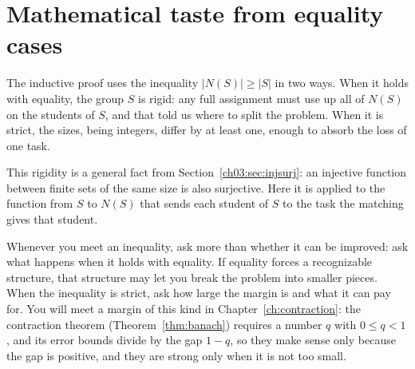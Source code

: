 \section{Mathematical taste from equality cases}\label{ch09:sec:taste}
The inductive proof uses the inequality $|N(S)|\ge|S|$ in two ways. When it holds with equality, the group $S$ is rigid: any full assignment must use up all of $N(S)$ on the students of $S$, and that told us where to split the problem. When it is strict, the sizes, being integers, differ by at least one, enough to absorb the loss of one task.

This rigidity is a general fact from Section~\ref{ch03:sec:injsurj}: an injective function between finite sets of the same size is also surjective. Here it is applied to the function from $S$ to $N(S)$ that sends each student of $S$ to the task the matching gives that student.

Whenever you meet an inequality, ask more than whether it can be improved: ask what happens when it holds with equality. If equality forces a recognizable structure, that structure may let you break the problem into smaller pieces. When the inequality is strict, ask how large the margin is and what it can pay for. You will meet a margin of this kind in Chapter~\ref{ch:contraction}: the contraction theorem (Theorem~\ref{thm:banach}) requires a number $q$ with $0\le q<1$, and its error bounds divide by the gap $1-q$, so they make sense only because the gap is positive, and they are strong only when it is not too small.

